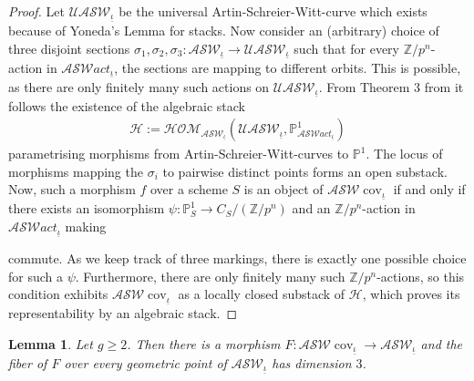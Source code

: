 \documentclass{compositio}
\newcommand{\huy}[1]{\todo[color=yellow]{HD: #1}}
\newcommand{\mat}[1]{\todo[color=green]{MH: #1}}
\newtheorem{lemma}[theorem]{Lemma}
\theoremstyle{remark}
\theoremstyle{remark}
\DeclareMathOperator{\cov}{cov}
\begin{document}
\begin{proof}
    Let $\mathcal{U}\mathcal{ASW}_{\underline{\iota}}$ be the universal Artin-Schreier-Witt-curve which exists because of Yoneda's Lemma for stacks.
    Now consider an (arbitrary) choice of three disjoint sections $\sigma_1, \sigma_2, \sigma_3: \mathcal{ASW}_{\underline{\iota}} \to \mathcal{U}\mathcal{ASW}_{\underline{\iota}}$ such that for every $\mathbb{Z}/p^n$-action in $\mathcal{ASW}act_{\underline{\iota}}$, the sections are mapping to different orbits. This is possible, as there are only finitely many such actions on $\mathcal{U}\mathcal{ASW}_{\underline{\iota}}$. From Theorem $3$ from \cite{HALL2014194} it follows the existence of the algebraic stack
    \begin{align*}
        \mathcal{H}:= \mathcal{HOM}_{\mathcal{ASW}_{\underline{\iota}}}(\mathcal{U}\mathcal{ASW}_{\underline{\iota}}, \mathbb{P}^1_{\mathcal{ASW}act_{\underline{\iota}}})
    \end{align*}
    parametrising morphisms from Artin-Schreier-Witt-curves to $\mathbb{P}^1$. The locus of morphisms mapping the $\sigma_i$ to pairwise distinct
    points forms an open substack. Now, such a morphism $f$ over a scheme $S$ is an object of $\mathcal{ASW}\cov_{\underline{\iota}}$ if and only if there exists an isomorphism $\psi: \mathbb{P}^1_S \to C_S/(\mathbb{Z}/p^n)$ and an $\mathbb{Z}/p^n$-action in $\mathcal{ASW}act_{\underline{\iota}}$ making

    \begin{center}
\end{center}
commute. As we keep track of three markings, there is exactly one possible choice for such a $\psi$. Furthermore, there are only finitely many such $\mathbb{Z}/p^n$-actions, so this condition exhibits $\mathcal{ASW}\cov_{\underline{\iota}}$ as a locally closed substack of  $\mathcal{H}$, which proves 
its representability by an algebraic stack.
\end{proof}

\begin{lemma}
\label{lemmacoverandcurve}
Let $g \ge 2$. Then there is a morphism $F: \mathcal{ASW} \cov_{\underline{\iota}} \xrightarrow{} \mathcal{ASW}_{\underline{\iota}}$ and the fiber of $F$ over every geometric point of $\mathcal{ASW}_{\underline{\iota}}$ has dimension $3$.
\end{lemma}
\end{document}
